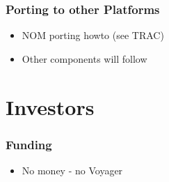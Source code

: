\documentclass{beamer}
\begin{document}
\begin{frame}
\frametitle{Porting to other Platforms}
\begin{itemize}
  \item NOM porting howto (see TRAC)
  \item Other components will follow
\end{itemize}
\end{frame}


\section{Investors}

\begin{frame}
\frametitle{Funding}
\begin{itemize}
  \item No money - no Voyager
\end{itemize}
\end{frame}
\end{document}
